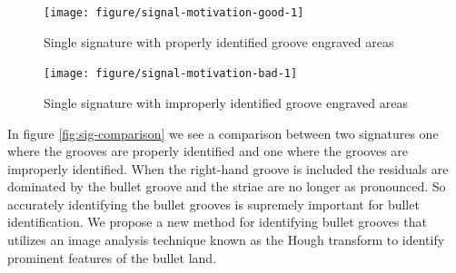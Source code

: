 \documentclass[12pt]{article}\usepackage[]{graphicx}\usepackage[]{color}
\newenvironment{knitrout}{}{} %
\theoremstyle{nonumberplain}
\begin{document}
\begin{knitrout}
\color{fgcolor}\begin{figure}

{\centering \texttt{[image: figure/signal-motivation-good-1]} 

}

\caption[Single signature with properly identified groove engraved areas]{Single signature with properly identified groove engraved areas}\label{fig:signal-motivation-good}
\end{figure}


\end{knitrout}


\begin{knitrout}
\color{fgcolor}\begin{figure}

{\centering \texttt{[image: figure/signal-motivation-bad-1]} 

}

\caption[Single signature with improperly identified groove engraved areas]{Single signature with improperly identified groove engraved areas}\label{fig:signal-motivation-bad}
\end{figure}


\end{knitrout}



In figure \ref{fig:sig-comparison} we see a comparison between two signatures one where the grooves are properly identified and one where the grooves are improperly identified. When the right-hand groove is included the residuals are dominated by the bullet groove and the striae are no longer as pronounced. So accurately identifying the bullet grooves is supremely important for bullet identification. We propose a new method for identifying bullet grooves that utilizes an image analysis technique known as the Hough transform to identify prominent features of the bullet land. 
\end{document}
